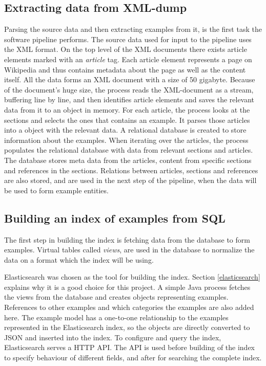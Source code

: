 \subsection{Extracting data from XML-dump}
Parsing the source data and then extracting examples from it, is the first task the software pipeline performs. The source data used for input to the pipeline uses the XML format. On the top level of the XML documents there exists article elements marked with an \textit{article} tag. Each article element represents a page on Wikipedia and thus contains metadata about the page as well as the content itself. All the data forms an XML document with a size of 50 gigabyte. Because of the document's huge size, the process reads the XML-document as a stream, buffering line by line, and then identifies article elements and saves the relevant data from it to an object in memory. For each article, the process looks at the sections and selects the ones that contains an example. It parses those articles into a object with the relevant data. A relational database is created to store information about the examples. When iterating over the articles, the process populates the relational database with data from relevant sections and articles. The database stores meta data from the articles, content from specific sections and references in the sections. Relations between articles, sections and references are also stored, and are used in the next step of the pipeline, when the data will be used to form example entities. 

\subsection{Building an index of examples from SQL}
The first step in building the index is fetching data from the database to form examples. Virtual tables called \textit{views}, are used in the database to normalize the data on a format which the index will be using.

Elasticsearch was chosen as the tool for building the index. Section \ref{elasticsearch} explains why it is a good choice for this project. A simple Java process fetches the views from the database and creates objects representing examples. References to other examples and which categories the examples are also added here. The example model has a one-to-one relationship to the examples represented in the Elasticsearch index, so the objects are directly converted to JSON and inserted into the index. To configure and query the index, Elasticsearch serves a HTTP API. The API is used before building of the index to specify behaviour of different fields, and after for searching the complete index.


